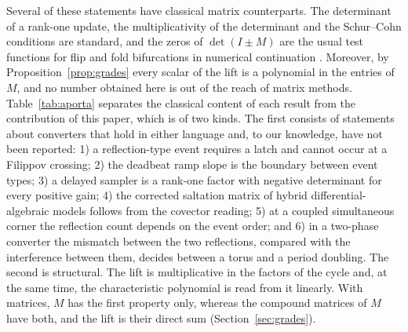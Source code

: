 \documentclass[journal]{IEEEtran}
\begin{document}
Several of these statements have classical matrix counterparts. The
determinant of a rank-one update, the multiplicativity of the determinant and
the Schur--Cohn conditions are standard, and the zeros of $\det(I\pm M)$ are
the usual test functions for flip and fold bifurcations in numerical
continuation \cite{kuznetsov2004}. Moreover, by
Proposition~\ref{prop:grades} every scalar of the lift is a polynomial in the
entries of $M$, and no number obtained here is out of the reach of matrix
methods. Table~\ref{tab:aporta} separates the classical content of each
result from the contribution of this paper, which is of two kinds. The first
consists of statements about converters that hold in either language and, to
our knowledge, have not been reported: 1) a reflection-type event
requires a latch and cannot occur at a Filippov crossing; 2) the deadbeat
ramp slope is the boundary between event types; 3) a delayed sampler is a
rank-one factor with negative determinant for every positive gain; 4) the
corrected saltation matrix of hybrid differential-algebraic models follows
from the covector reading; 5) at a coupled simultaneous corner the
reflection count depends on the event order; and 6) in a two-phase converter
the mismatch between the two reflections, compared with the interference
between them, decides between a torus and a period doubling. The second is
structural. The
lift is multiplicative in the factors of the cycle and, at the same time, the
characteristic polynomial is read from it linearly. With matrices, $M$ has
the first property only, whereas the compound matrices of $M$ have both, and
the lift is their direct sum (Section~\ref{sec:grades}).
\end{document}

